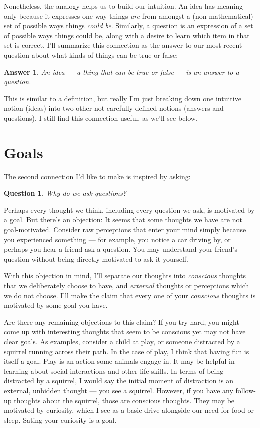 \documentclass[9pt, twoside]{book}
\newtheorem*{answer}{Answer}
\newtheorem*{question*}{Question}
\theoremstyle{argtstyle}
\begin{document}
Nonetheless, the analogy helps us to build our intuition.
An idea has meaning only because it expresses one way things
{\em are} from amongst a
(non-mathematical) set of possible ways things {\em could be}.
Similarly, a question is an expression of a set of possible ways things could
be, along with a desire to learn which item in that set is correct.
I'll summarize this
connection as the answer to our most recent question about what
kinds of things can be true or false:
\begin{answer}
An idea --- a thing that can be true or false --- is an answer to a question.
\end{answer}

This is similar to a definition, but really I'm just breaking down
one intuitive notion (ideas) into two other not-carefully-defined notions
(answers and questions). I still find this connection useful, as we'll see
below.

\section{Goals}

The second connection I'd like to make is inspired by asking:
\begin{question*}
    Why do we ask questions?
\end{question*}

Perhaps every thought we think, including every question we ask,
is motivated by a goal.
But there's an objection: It seems that some thoughts
we have are not goal-motivated.
Consider raw perceptions that enter your mind simply because
you experienced something --- for example, you notice a car driving by,
or perhaps you hear a friend ask a question. You may understand
your friend's question without being directly motivated to ask it yourself.

With this objection in mind, I'll separate our thoughts into
{\em conscious} thoughts that we deliberately choose to have,
and {\em external} thoughts or perceptions which we do not choose.
I'll make the claim that every one of your {\em conscious}
thoughts
is motivated by some goal you have.

Are there any remaining objections to this claim?
If you try hard, you might come up with interesting 
thoughts that seem to be conscious yet may not have
clear goals. As examples, consider a child at play, or
someone distracted by a squirrel running across their path.
In the case of play, I think that having fun is itself a goal.
Play is an action some animals engage in.
It may be helpful in learning about social interactions and
other life skills.
In terms of being distracted by a squirrel,
I would say the initial moment of distraction is an
external, unbidden thought --- you see a squirrel. However,
if you have any follow-up thoughts about the squirrel, those
are conscious thoughts. They may be motivated by
curiosity, which I see as a basic drive alongside
our need for food or sleep.
Sating your curiosity is a goal.
\end{document}
